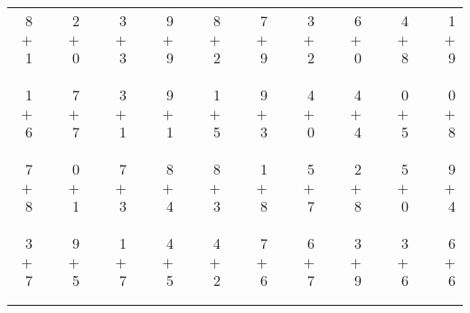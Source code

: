\documentclass[12pt, letterpaper]{article}
\begin{document}
\begin{tabular}{rrrrrrrrrrrrrrrrrrr}
8 & & 2 & & 3 & & 9 & & 8 & & 7 & & 3 & & 6 & & 4 & & 1\\
$+$ 1 & & $+$ 0 & & $+$ 3 & & $+$ 9 & & $+$ 2 & & $+$ 9 & & $+$ 2 & & $+$ 0 & & $+$ 8 & & $+$ 9\\
\cline{1-1} \cline{3-3} \cline{5-5} \cline{7-7} \cline{9-9} \cline{11-11} \cline{13-13} \cline{15-15} \cline{17-17} \cline{19-19} \\ \\
1 & & 7 & & 3 & & 9 & & 1 & & 9 & & 4 & & 4 & & 0 & & 0\\
$+$ 6 & & $+$ 7 & & $+$ 1 & & $+$ 1 & & $+$ 5 & & $+$ 3 & & $+$ 0 & & $+$ 4 & & $+$ 5 & & $+$ 8\\
\cline{1-1} \cline{3-3} \cline{5-5} \cline{7-7} \cline{9-9} \cline{11-11} \cline{13-13} \cline{15-15} \cline{17-17} \cline{19-19} \\ \\
7 & & 0 & & 7 & & 8 & & 8 & & 1 & & 5 & & 2 & & 5 & & 9\\
$+$ 8 & & $+$ 1 & & $+$ 3 & & $+$ 4 & & $+$ 3 & & $+$ 8 & & $+$ 7 & & $+$ 8 & & $+$ 0 & & $+$ 4\\
\cline{1-1} \cline{3-3} \cline{5-5} \cline{7-7} \cline{9-9} \cline{11-11} \cline{13-13} \cline{15-15} \cline{17-17} \cline{19-19} \\ \\
3 & & 9 & & 1 & & 4 & & 4 & & 7 & & 6 & & 3 & & 3 & & 6\\
$+$ 7 & & $+$ 5 & & $+$ 7 & & $+$ 5 & & $+$ 2 & & $+$ 6 & & $+$ 7 & & $+$ 9 & & $+$ 6 & & $+$ 6\\
\cline{1-1} \cline{3-3} \cline{5-5} \cline{7-7} \cline{9-9} \cline{11-11} \cline{13-13} \cline{15-15} \cline{17-17} \cline{19-19} \\ \\
\end{tabular}
\newpage
\end{document}
